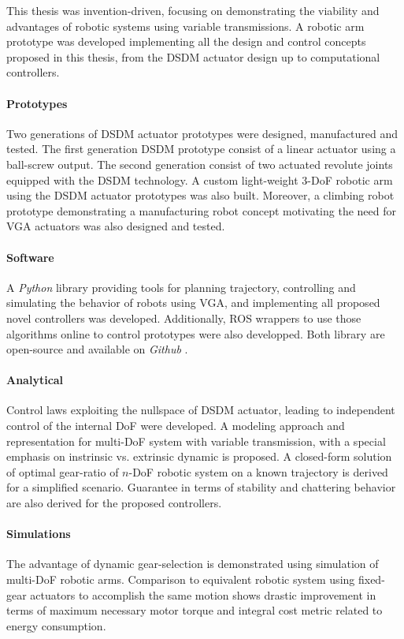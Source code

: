 This thesis was invention-driven, focusing on demonstrating the viability and advantages of robotic systems using variable transmissions. A robotic arm prototype was developed implementing all the design and control concepts proposed in this thesis, from the DSDM actuator design up to computational controllers. 

\paragraph{Prototypes}
%
Two generations of DSDM actuator prototypes were designed, manufactured and tested. The first generation DSDM prototype consist of a linear actuator using a ball-screw output. The second generation consist of two actuated revolute joints equipped with the DSDM technology. A custom light-weight 3-DoF robotic arm using the DSDM actuator prototypes was also built. Moreover, a climbing robot prototype demonstrating a manufacturing robot concept motivating the need for VGA actuators was also designed and tested.

\paragraph{Software}
%
A \emph{Python} library providing tools for planning trajectory, controlling and simulating the behavior of robots using VGA, and implementing all proposed novel controllers was developed. Additionally, ROS wrappers to use those algorithms online to control prototypes were also developped. Both library are open-source and available on \emph{Github} \cite{girard_github.com/alx87grd/alexrobotics_2017}\cite{girard_github.com/alx87grd/dsdm_robotics_ros_2017}.


\paragraph{Analytical}
%
Control laws exploiting the nullspace of DSDM actuator, leading to independent control of the internal DoF were developed. A modeling approach and representation for multi-DoF system with variable transmission, with a special emphasis on instrinsic vs. extrinsic dynamic is proposed. A closed-form solution of optimal gear-ratio of $n$-DoF robotic system on a known trajectory is derived for a simplified scenario. Guarantee in terms of stability and chattering behavior are also derived for the proposed controllers.

\paragraph{Simulations}
%
The advantage of dynamic gear-selection is demonstrated using simulation of multi-DoF robotic arms. Comparison to equivalent robotic system using fixed-gear actuators to accomplish the same motion shows drastic improvement in terms of maximum necessary motor torque and integral cost metric related to energy consumption. 

